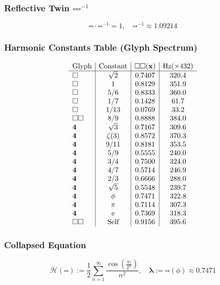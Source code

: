 \subsubsection{Reflective Twin \( \square \square \square^{-1} \)}
\[
\square \square \cdot \square \square^{-1} = 1, \quad \square \square^{-1} \approx 1.09214
\]

\subsubsection{Harmonic Constants Table (Glyph Spectrum)}
\[
\begin{array}{l | c | c | c}
\text{Glyph} & \text{Constant} & \square \square (\mathbf{x}) & \text{Hz} (\times 432) \\
\hline
\square & \sqrt{2} & 0.7407 & 320.4 \\
\square & 1 & 0.8129 & 351.9 \\
\square & 5/6 & 0.8333 & 360.0 \\
\square & 1/7 & 0.1428 & 61.7 \\
\square & 1/13 & 0.0769 & 33.2 \\
\square \square & 8/9 & 0.8888 & 384.0 \\
\mathbf{4} & \sqrt{3} & 0.7167 & 309.6 \\
\mathbf{4} & \zeta(3) & 0.8572 & 370.3 \\
\mathbf{4} & 9/11 & 0.8181 & 353.5 \\
\mathbf{4} & 5/9 & 0.5555 & 240.0 \\
\mathbf{4} & 3/4 & 0.7500 & 324.0 \\
\mathbf{4} & 4/7 & 0.5714 & 246.9 \\
\mathbf{4} & 2/3 & 0.6666 & 288.0 \\
\mathbf{4} & \sqrt{5} & 0.5548 & 239.7 \\
\mathbf{4} & \phi & 0.7471 & 322.8 \\
\mathbf{4} & \pi & 0.7114 & 307.3 \\
\mathbf{4} & \mathrm{e} & 0.7369 & 318.3 \\
\square \square & \text{Self} & 0.9156 & 395.6 \\
\end{array}
\]

\subsubsection{Collapsed Equation}
\[
\mathcal{H}(\square \square) := \frac{1}{2} \sum_{n=1}^{\infty} \frac{\cos \left( \frac{\pi \square}{2^n} \right)}{n^2}, \quad \boldsymbol{\lambda} := \square \square (\phi) \approx 0.7471
\]


